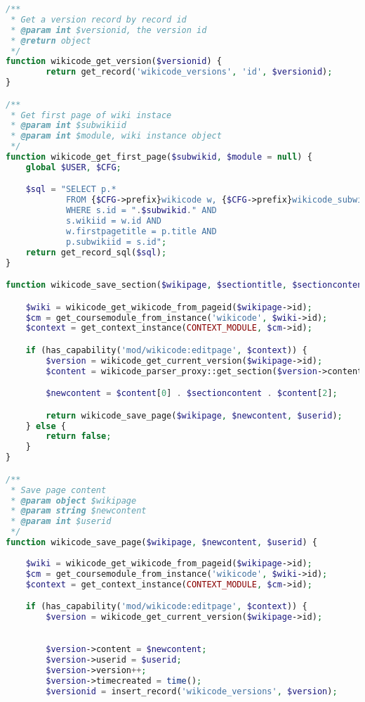 \begin{lstlisting}[language=PHP]
/**
 * Get a version record by record id
 * @param int $versionid, the version id
 * @return object
 */
function wikicode_get_version($versionid) {
        return get_record('wikicode_versions', 'id', $versionid);
}

/**
 * Get first page of wiki instace
 * @param int $subwikiid
 * @param int $module, wiki instance object
 */
function wikicode_get_first_page($subwikid, $module = null) {
    global $USER, $CFG;

    $sql = "SELECT p.*
            FROM {$CFG->prefix}wikicode w, {$CFG->prefix}wikicode_subwikis s, {$CFG->prefix}wikicode_pages p
            WHERE s.id = ".$subwikid." AND
            s.wikiid = w.id AND
            w.firstpagetitle = p.title AND
            p.subwikiid = s.id";
    return get_record_sql($sql);
}

function wikicode_save_section($wikipage, $sectiontitle, $sectioncontent, $userid) {

    $wiki = wikicode_get_wikicode_from_pageid($wikipage->id);
    $cm = get_coursemodule_from_instance('wikicode', $wiki->id);
    $context = get_context_instance(CONTEXT_MODULE, $cm->id);

    if (has_capability('mod/wikicode:editpage', $context)) {
        $version = wikicode_get_current_version($wikipage->id);
        $content = wikicode_parser_proxy::get_section($version->content, $version->contentformat, $sectiontitle, true);

        $newcontent = $content[0] . $sectioncontent . $content[2];

        return wikicode_save_page($wikipage, $newcontent, $userid);
    } else {
        return false;
    }
}

/**
 * Save page content
 * @param object $wikipage
 * @param string $newcontent
 * @param int $userid
 */
function wikicode_save_page($wikipage, $newcontent, $userid) {
        
    $wiki = wikicode_get_wikicode_from_pageid($wikipage->id);
    $cm = get_coursemodule_from_instance('wikicode', $wiki->id);
    $context = get_context_instance(CONTEXT_MODULE, $cm->id);

    if (has_capability('mod/wikicode:editpage', $context)) {
        $version = wikicode_get_current_version($wikipage->id);
		

        $version->content = $newcontent;
        $version->userid = $userid;
        $version->version++;
        $version->timecreated = time();
        $versionid = insert_record('wikicode_versions', $version);


\end{lstlisting}
